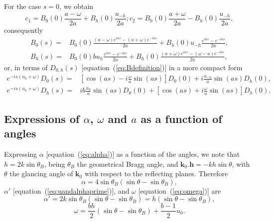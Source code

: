 \documentclass[preprint]{iucr}              %
\newcommand{\inred}[1]{{\color{red}#1}}
\begin{document}
For the case $s=0$, we obtain
\begin{equation}
\label{eq:cs}
c_1=B_0(0) \frac{a-\omega}{2a}
+ B_h(0) \frac{u_{-h}}{2a}; 
c_2=B_0(0)
\frac{a+\omega}{2a} - 
B_h(0) \frac{u_{-h}}{2a}, \nonumber
\end{equation}
consequently
\begin{subequations}
\label{eq:preBSolutions}
\begin{align}
B_0(s) = &B_0(0) \frac{(a-\omega)e^{ias}-(a+\omega) e^{-ias}}{2a} +
B_h(0) u_{-h} \frac{e^{ias} - e^{-ias}}{2a}, \nonumber\\
B_h(s) = &B_0(0) b u_h 
\frac{e^{ias}-e^{-ias}}{2a}
+ B_h(0) 
\frac{(a+\omega) e^{ias}- (\omega-a) e^{-ias}}{2a}
, \nonumber
\end{align}
\end{subequations}
or, in terms of $D_{0,h}(s)$ [equation~(\ref{eq:Bdefinition})] in a more compact form
\begin{subequations}
\label{eq:DSolutionsCompact}
\begin{align}
e^{-is(u_0+\omega)} D_0(s) = & [\cos(as) - i\frac{\omega}{a}\sin(as)] D_0(0) +     i \frac{u_{-h}}{a}\sin(as) D_h(0), \\
e^{-is(u_0+\omega)} D_h(s) = & i b \frac{u_h}{a} \sin(as) D_0(0) + 
    [\cos(as) + i \frac{\omega}{a} \sin(as)] D_h(0).
\end{align}
\end{subequations}

\subsection{Expressions of  $\alpha$, $\omega$ and $a$ as a function of angles}
\label{sec:physical_meaning}
Expressing $\alpha$ [equation~(\ref{eq:alpha})] as a function of the angles, we note that $h=2k \sin\theta_B$, being $\theta_B$ the geometrical Bragg angle, and $\textbf{k}_0 . \textbf{h}= -k h \sin\theta$, with $\theta$ the glancing angle of $\textbf{k}_0$ with respect to the reflecting planes. Therefore
\begin{equation}\label{eq:alphavsangles}
    \alpha=4\sin\theta_B (\sin\theta-\sin\theta_B),
\end{equation}
$\alpha'$ [equation~(\ref{eq:uandalphaprime})], and $\omega$ [equation~(\ref{eq:omega})] are
\begin{equation}\label{eq:alphaprimevsangles}
    \alpha'=2 k \sin\theta_B(\sin\theta-\sin\theta_B)=h(\sin\theta-\sin\theta_B),
\end{equation}
\begin{equation}\label{eq:omegavsangles}
    \omega=\frac{b h}{2} (\sin\theta-\sin\theta_B) + \frac{b-1}{2} u_0.
\end{equation}
\end{document}
